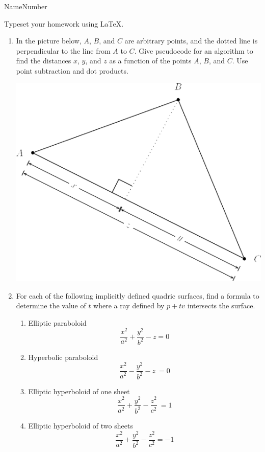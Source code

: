 \documentclass{article}
\begin{document}
\bigskip

\noindent Name\hrulefill Number \hrulefill

Typeset your homework using \LaTeX.

\begin{enumerate}

\item
  In the picture below, $A$, $B$, and $C$ are arbitrary points, and the
dotted line is perpendicular to the line from $A$ to $C$.  Give
pseudocode for an algorithm to find the distances $x$, $y$, and
$z$ as a function of the points $A$, $B$, and $C$.  Use point
subtraction and dot products.

\includegraphics[scale=0.25]{fig01.png}

\newpage

\item For each of the following implicitly defined quadric surfaces, find a formula
  to determine the value of $t$ where a ray defined by $p + tv$ intersects the surface.
  \begin{enumerate}
  \item Elliptic paraboloid \[\frac{x^2}{a^2} + \frac{y^2}{b^2} - z = 0\]
\vfill
  \item Hyperbolic paraboloid \[\frac{x^2}{a^2} - \frac{y^2}{b^2} - z\ = 0\]
\vfill
  \item Elliptic hyperboloid of one sheet \[\frac{x^2}{a^2} + \frac{y^2}{b^2} - \frac{z^2}{c^2}\ = 1\]
\vfill
  \item Elliptic hyperboloid of two sheets
    \[ \frac{x^2}{a^2} + \frac{y^2}{b^2} - \frac{z^2}{c^2} = -1\]
  \end{enumerate}
  \vfill
  \newpage
  

\end{enumerate}
\end{document}
